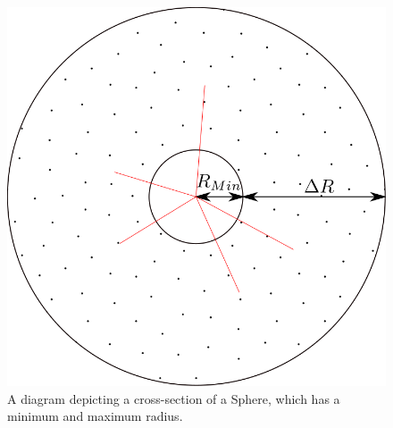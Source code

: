 \documentclass[12pt,a4paper]{article}
\begin{document}
\begin{figure}[h!]
\centering
\includegraphics[scale=0.2]{Images//Materials//RMAX.png}
\caption[width=\columnwidth]{A diagram depicting a cross-section of a Sphere, which has a minimum and maximum radius.}
\label{deltar}
\end{figure}

\newpage
\end{document}
